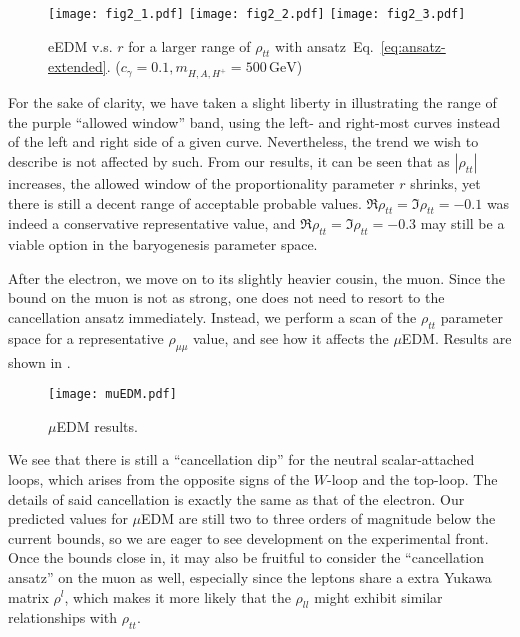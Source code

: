 \begin{figure}[t]
    \centering
    \texttt{[image: fig2\_1.pdf]}
    \texttt{[image: fig2\_2.pdf]}
    \texttt{[image: fig2\_3.pdf]}
    \caption{eEDM v.s. \(r \) for a larger range of \(\rho_{tt} \) with ansatz~Eq.~\eqref{eq:ansatz-extended}. (\(c_{\gamma} = 0.1, m_{H, A, H^+} = 500\,\mathrm{GeV} \))}
    \label{fig:eEDM}
\end{figure}

For the sake of clarity, we have taken a slight liberty in illustrating the range of the purple ``allowed window'' band,
using the left- and right-most curves instead of the left and right side of a given curve.
Nevertheless, the trend we wish to describe is not affected by such.
From our results, it can be seen that as \(|\rho_{tt}| \) increases, the allowed window of the proportionality parameter \(r \) shrinks, yet there is still a decent range of acceptable probable values.
\(\Re\rho_{tt} = \Im\rho_{tt} = -0.1 \) was indeed a conservative representative value, and \(\Re\rho_{tt} = \Im\rho_{tt} = -0.3 \) may still be a viable option in the baryogenesis parameter space.

After the electron, we move on to its slightly heavier cousin, the muon. 
Since the bound on the muon is not as strong, one does not need to resort to the cancellation ansatz immediately.
Instead, we perform a scan of the \(\rho_{tt} \) parameter space for a representative \(\rho_{\mu\mu} \) value, and see how it affects the \(\mu \)EDM.
Results are shown in .

\begin{figure}[t]
    \centering
    \texttt{[image: muEDM.pdf]}
    \caption{\(\mu \)EDM results.}
    \label{fig:muEDM}
\end{figure}

We see that there is still a ``cancellation dip'' for the neutral scalar-attached loops, which arises from the opposite signs of the \(W \)-loop and the top-loop.
The details of said cancellation is exactly the same as that of the electron.
Our predicted values for \(\mu \)EDM are still two to three orders of magnitude below the current bounds, so we are eager to see development on the experimental front.
Once the bounds close in, it may also be fruitful to consider the ``cancellation ansatz'' on the muon as well, especially since the leptons share a extra Yukawa matrix \(\rho^{l} \),
which makes it more likely that the \(\rho_{ll} \) might exhibit similar relationships with \(\rho_{tt} \).

